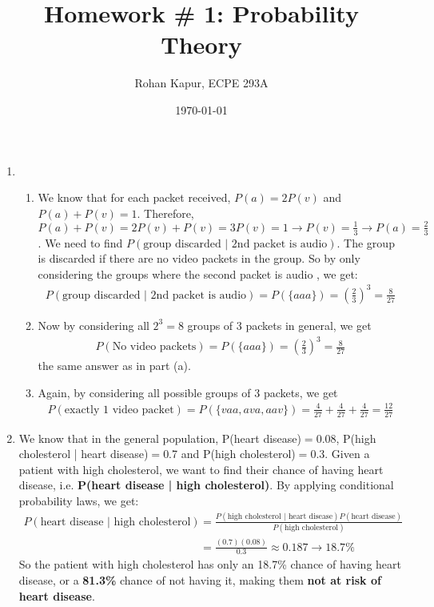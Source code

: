 \documentclass[11pt,twoside]{article}
\title{Homework \# 1: Probability Theory}
\author{Rohan Kapur, ECPE 293A}
\date{\today}
\begin{document}
\maketitle

\begin{enumerate}
	\item
	      \begin{enumerate}
		      \item We know that for each packet received, $P(a) = 2P(v)$ and $P(a)+P(v)=1$. Therefore, $P(a)+P(v)=2P(v)+P(v)=3P(v)=1 \rightarrow P(v)=\frac{1}{3} \rightarrow P(a) = \frac{2}{3}$. We need to find $P(\text{group discarded | 2nd packet is audio})$. The group is discarded if there are no video packets in the group. So by only considering the groups where the second packet is audio , we get:
		            \begin{align*}
			            P(\text{group discarded | 2nd packet is audio}) = P(\{aaa\}) = \left(\frac{2}{3}\right)^3 = \boxed{\frac{8}{27}}
		            \end{align*}
		      \item Now by considering all $2^3 = 8$ groups of 3 packets in general, we get
		            \begin{align*}
			            P(\text{No video packets}) = P(\{aaa\}) = \left(\frac{2}{3}\right)^3 = \boxed{\frac{8}{27}}
		            \end{align*}
		            the same answer as in part (a).
		      \item Again, by considering all possible groups of 3 packets, we get
		            \begin{align*}
			            P(\text{exactly 1 video packet}) = P(\{vaa, ava, aav\}) = \frac{4}{27} + \frac{4}{27} + \frac{4}{27} = \boxed{\frac{12}{27}}
		            \end{align*}
	      \end{enumerate}
	\item
	      We know that in the general population, P(heart disease)$=$0.08, P(high cholesterol | heart disease)$=$0.7 and P(high cholesterol)$=$0.3. Given a patient with high cholesterol, we want to find their chance of having heart disease, i.e. \textbf{P(heart disease | high cholesterol)}. By applying conditional probability laws, we get:
	      \begin{align*}
		      P(\text{heart disease | high cholesterol}) & = \frac{P(\text{high cholesterol | heart disease})P(\text{heart disease})}{P(\text{high cholesterol})} \\ &= \frac{(0.7)(0.08)}{0.3} \approx 0.187 \rightarrow \boxed{18.7\%}
	      \end{align*}
	      So the patient with high cholesterol has only an 18.7\% chance of having heart disease, or a \textbf{81.3\%} chance of not having it, making them \textbf{not at risk of heart disease}.
\end{enumerate}
\end{document}
